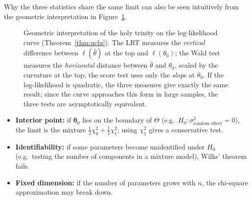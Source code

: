 \documentclass[main.tex]{subfiles}
\begin{document}
Why the three statistics share the same limit can also be seen intuitively from the geometric interpretation in Figure~\ref{fig:uc-test}.

\begin{figure}[ht]
\centering
{}
\caption{Geometric interpretation of the holy trinity on the log-likelihood curve (Theorem~\ref{thm:uclu}). The LRT measures the \emph{vertical} difference between $\ell(\hat\theta)$ at the top and $\ell(\theta_0)$; the Wald test measures the \emph{horizontal} distance between $\hat\theta$ and $\theta_0$, scaled by the curvature at the top; the score test uses only the \emph{slope} at $\theta_0$. If the log-likelihood is quadratic, the three measures give exactly the same result; since the curve approaches this form in large samples, the three tests are asymptotically equivalent.}\label{fig:uc-test}
\end{figure}

\begin{remark}
\begin{itemize}
  \item \textbf{Interior point:} if $\bm\theta_0$ lies on the boundary of $\Theta$ (e.g.\ $H_0:\sigma^2_{\text{random effect}}=0$), the limit is the mixture $\frac12\chi^2_0+\frac12\chi^2_1$; using $\chi^2_1$ gives a conservative test.
  \item \textbf{Identifiability:} if some parameters become unidentified under $H_0$ (e.g.\ testing the number of components in a mixture model), Wilks' theorem fails.
  \item \textbf{Fixed dimension:} if the number of parameters grows with $n$, the chi-square approximation may break down.
\end{itemize}
\end{remark}
\end{document}
